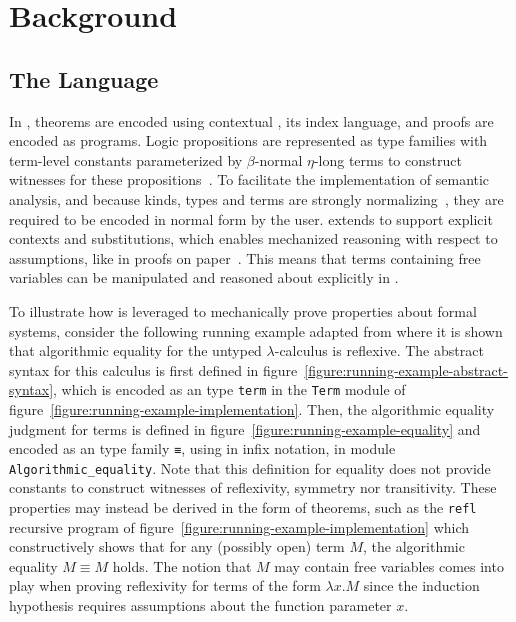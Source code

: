\chapter{Background}

\section{The \Beluga Language}

In \Beluga, theorems are encoded using contextual \LF, its index language, and proofs are encoded as programs.
Logic propositions are represented as \LF type families with term-level constants parameterized by $\beta$-normal $\eta$-long \LF terms to construct witnesses for these propositions~\cite{nanevski2008contextual, foundation2008pientka, DBLP:journals/corr/abs-1009-2789}.
To facilitate the implementation of semantic analysis, and because \LF kinds, types and terms are strongly normalizing~\cite{harper1993framework}, they are required to be encoded in normal form by the user.
\Beluga extends \LF to support explicit contexts and substitutions, which enables mechanized reasoning with respect to assumptions, like in proofs on paper~\cite{pientka2010programming}.
This means that terms containing free variables can be manipulated and reasoned about explicitly in \Beluga.

To illustrate how \Beluga is leveraged to mechanically prove properties about formal systems, consider the following running example adapted from \cite{felty2010reasoning} where it is shown that algorithmic equality for the untyped $\lambda$-calculus is reflexive.
The abstract syntax for this calculus is first defined in figure~\ref{figure:running-example-abstract-syntax}, which is encoded as an \LF type \verb|term| in the \verb|Term| module of figure~\ref{figure:running-example-implementation}.
Then, the algorithmic equality judgment for terms is defined in figure~\ref{figure:running-example-equality} and encoded as an \LF type family \verb|≡|, using in infix notation, in module \verb|Algorithmic_equality|.
Note that this definition for equality does not provide constants to construct witnesses of reflexivity, symmetry nor transitivity.
These properties may instead be derived in the form of theorems, such as the \verb|refl| recursive program of figure~\ref{figure:running-example-implementation} which constructively shows that for any (possibly open) term $M$, the algorithmic equality $M \equiv M$ holds.
The notion that $M$ may contain free variables comes into play when proving reflexivity for terms of the form $\lambda x. M$ since the induction hypothesis requires assumptions about the function parameter $x$.

